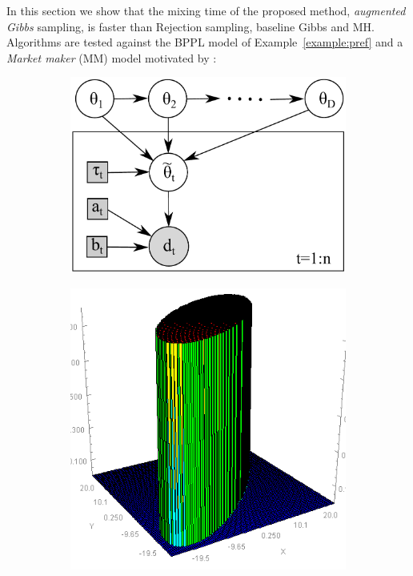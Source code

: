 \documentclass[letterpaper]{article}
\begin{document}
In this section we show that the mixing time of the proposed method, \emph{augmented Gibbs} sampling, is faster than Rejection sampling, baseline 
Gibbs and MH.     
Algorithms are tested against the BPPL model of Example~\ref{example:pref} and a \emph{Market maker} (MM) model motivated by \cite{Das:08}:
\begin{figure}
\centering
\begin{subfigure}{.35\textwidth}
\centering
\includegraphics[width=.90\textwidth]{pic/market4w.pdf}
\caption{}
\label{fig:market}
\end{subfigure}
\begin{subfigure}{.24\textwidth}
  \centering
  \includegraphics[width=.82\textwidth]{pic/elipsePrior.png}

\end{subfigure}
\end{figure}
\end{document}
